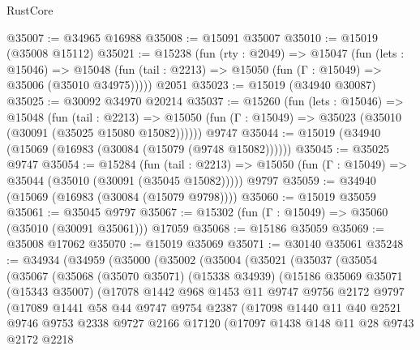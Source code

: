 \begin{lexlean}{RustCore}
\begin{coremodule}
@35007 := @34965 @16988
@35008 := @15091 @35007
@35010 := @15019 (@35008 @15112)
@35021 := @15238
    (fun (rty : @2049) =>
    @15047
      (fun (lets : @15046) =>
      @15048 (fun (tail : @2213) => @15050 (fun (Γ : @15049) => @35006 (@35010 @34975)))))
    @2051
@35023 := @15019 (@34940 @30087)
@35025 := @30092 @34970 @20214
@35037 := @15260
    (fun (lets : @15046) =>
    @15048
      (fun (tail : @2213) =>
      @15050 (fun (Γ : @15049) => @35023 (@35010 (@30091 (@35025 @15080 @15082))))))
    @9747
@35044 := @15019 (@34940 (@15069 (@16983 (@30084 (@15079 (@9748 @15082))))))
@35045 := @35025 @9747
@35054 := @15284
    (fun (tail : @2213) => @15050 (fun (Γ : @15049) => @35044 (@35010 (@30091 (@35045 @15082)))))
    @9797
@35059 := @34940 (@15069 (@16983 (@30084 (@15079 @9798))))
@35060 := @15019 @35059
@35061 := @35045 @9797
@35067 := @15302 (fun (Γ : @15049) => @35060 (@35010 (@30091 @35061))) @17059
@35068 := @15186 @35059
@35069 := @35008 @17062
@35070 := @15019 @35069
@35071 := @30140 @35061
@35248 := @34934
    (@34959
      (@35000
        (@35002
          (@35004
            (@35021
              (@35037
                (@35054
                  (@35067
                    (@35068
                      (@35070 @35071)
                      (@15338 @34939)
                      (@15186
                        @35069
                        @35071
                        (@15343 @35007)
                        (@17078
                          @1442
                          @968
                          @1453
                          @11
                          @9747
                          @9756
                          @2172
                          @9797
                          (@17089
                            @1441
                            @58
                            @44
                            @9747
                            @9754
                            @2387
                            (@17098
                              @1440
                              @11
                              @40
                              @2521
                              @9746
                              @9753
                              @2338
                              @9727
                              @2166
                              @17120
                              (@17097
                                @1438
                                @148
                                @11
                                @28
                                @9743
                                @2172
                                @2218

\end{coremodule}
\end{lexlean}
